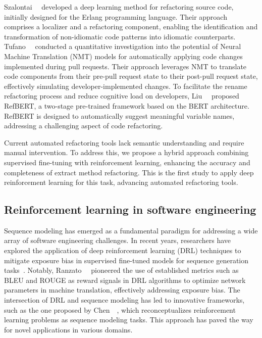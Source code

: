 Szalontai~\etal{}~\cite{szalontai2023deep} developed a deep learning method for refactoring source code, initially designed for the Erlang programming language. Their approach comprises a localizer and a refactoring component, enabling the identification and transformation of non-idiomatic code patterns into idiomatic counterparts. Tufano~\etal{}~\cite{tufano2019learning} conducted a quantitative investigation into the potential of Neural Machine Translation (NMT) models for automatically applying code changes implemented during pull requests. Their approach leverages NMT to translate code components from their pre-pull request state to their post-pull request state, effectively simulating developer-implemented changes. To facilitate the rename refactoring process and reduce cognitive load on developers, Liu~\etal{}~\cite{liu2023refbert} proposed RefBERT, a two-stage pre-trained framework based on the BERT architecture. RefBERT is designed to automatically suggest meaningful variable names, addressing a challenging aspect of code refactoring.


Current automated refactoring tools lack semantic understanding and require manual intervention. To address this, we propose a hybrid approach combining supervised fine-tuning with reinforcement learning, enhancing the accuracy and completeness of extract method refactoring. This is the first study to apply deep reinforcement learning for this task, advancing automated refactoring tools.


\subsection{Reinforcement learning in software engineering}

Sequence modeling has emerged as a fundamental paradigm for addressing a wide array of software engineering challenges. In recent years, researchers have explored the application of deep reinforcement learning (DRL) techniques to mitigate exposure bias in supervised fine-tuned models for sequence generation tasks~\cite{ranzato2016sequenceleveltrainingrecurrent, keneshloo2019deepreinforcementlearningsequence}. Notably, Ranzato~\etal{}~\cite{ranzato2016sequenceleveltrainingrecurrent} pioneered the use of established metrics such as BLEU and ROUGE as reward signals in DRL algorithms to optimize network parameters in machine translation, effectively addressing exposure bias. The intersection of DRL and sequence modeling has led to innovative frameworks, such as the one proposed by Chen~\etal{}~\cite{chen2021decisiontransformerreinforcementlearning}, which reconceptualizes reinforcement learning problems as sequence modeling tasks. This approach has paved the way for novel applications in various domains.

